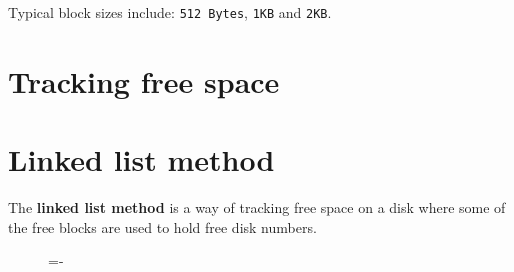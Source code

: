 \documentclass[a4paper]{systems-software}
\begin{document}
Typical block sizes include: \texttt{512 Bytes}, \texttt{1KB} and \texttt{2KB}.


\newpage

\section{Tracking free space}

\section*{Linked list method}

The \textbf{linked list method} is a way of tracking free space on a disk where some of the free blocks are used to hold free disk numbers.

\begin{figure}[H]
  \lineskip=-\fboxrule
\end{figure}
\end{document}
